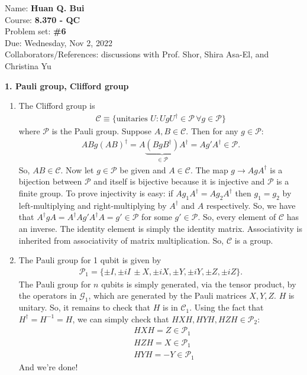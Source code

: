 \documentclass{article}
\theoremstyle{definition}
\begin{document}
\begin{framed}
\noindent Name: \textbf{Huan Q. Bui}\\
Course: \textbf{8.370 - QC}\\
Problem set: \textbf{\#6}\\
Due: Wednesday, Nov 2, 2022\\
Collaborators/References: discussions with Prof. Shor, Shira Asa-El, and Christina Yu
\end{framed}


\noindent \textbf{1. Pauli group, Clifford group} 

\begin{enumerate}[label=(\alph*)]
	\item The Clifford group is 
	\begin{align*}
		\mathcal{C} \equiv \{ \text{unitaries } U : U g U^\dagger \in \mathcal{P}\, \forall g \in \mathcal{P}     \}
	\end{align*}
where $\mathcal{P}$ is the Pauli group. Suppose $A,B\in \mathcal{C}$. Then for any $g\in \mathcal{P}$:
\begin{align*}
	AB g (AB)^\dagger =  A \underbrace{ (BgB^\dagger)}_{\in \mathcal{P}} A^\dagger= A g' A^\dagger \in \mathcal{P}.
\end{align*}
So, $AB\in \mathcal{C}$. Now let $g\in \mathcal{P}$ be given and $A\in \mathcal{C}$. The map $g\to A g A^\dagger$ is a bijection between $\mathcal{P}$ and itself is bijective because it is injective and $\mathcal{P}$ is a finite group. To prove injectivity is easy: if $Ag_1 A^\dagger = A g_2 A^\dagger$ then $g_1 = g_2$ by left-multiplying and right-multiplying by $A^\dagger$ and $A$ respectively. So, we have that $A^\dagger g A = A^\dagger A g' A^\dagger A = g' \in \mathcal{P}$ for some $g' \in \mathcal{P}$. So, every element of $\mathcal{C}$ has an inverse. The identity element is simply the identity matrix. Associativity is inherited from associativity of matrix multiplication. So, $\mathcal{C}$ is a group. 
	
	\item The Pauli group for 1 qubit is given by 
	\begin{align*}
		\mathcal{P}_1 = \{ \pm I, \pm iI\,\pm X, \pm iX, \pm Y, \pm i Y, \pm Z, \pm iZ \}.
	\end{align*}
	The Pauli group for $n$ qubits is simply generated, via the tensor product, by the operators in $\mathcal{G}_1$, which are generated by the Pauli matrices $X,Y,Z$. $H$ is unitary. So, it remains to check that $H$ is in $\mathcal{C}_1$. Using the fact that $H^\dagger = H^{-1} = H$, we can simply check that $HXH, HYH, HZH \in \mathcal{P}_2$:
	\begin{align*}
		&HXH = Z \in \mathcal{P}_1 \\
		&HZH = X \in \mathcal{P}_1 \\
		&HYH = -Y \in \mathcal{P}_1
	\end{align*}
	And we're done!
	

\end{enumerate}
\end{document}
